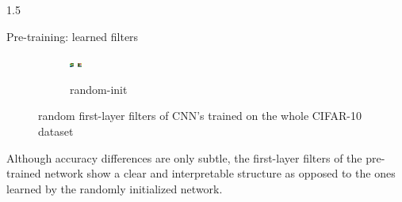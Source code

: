\documentclass[final]{beamer}
\newlength{\onecolwid}
\newlength{\threecolwid}
\begin{document}
\begin{frame}[t]
\begin{columns}[t]
\begin{column}{\threecolwid}
\begin{columns}[t, totalwidth=\threecolwid]
\begin{column}{1.5\onecolwid}
\begin{alertblock}{Pre-training: learned filters}
\begin{figure}
\begin{subfigure}{.4\linewidth}
				\includegraphics[width=0.1\linewidth]{graphics/cifar_filters/random_17.png} %
				\includegraphics[width=0.1\linewidth]{graphics/cifar_filters/random_18.png}
				\caption{random-init}
			\end{subfigure}

			\caption{random first-layer filters of CNN's trained on the whole CIFAR-10 dataset}

		\end{figure}

		Although accuracy differences are only subtle, the first-layer filters of the pre-trained network show a clear and interpretable structure as opposed to the ones learned by the randomly initialized network.

	\end{alertblock}

\end{column}

\end{columns}




\end{column}
\end{columns} %

\end{frame} %
\end{document}
